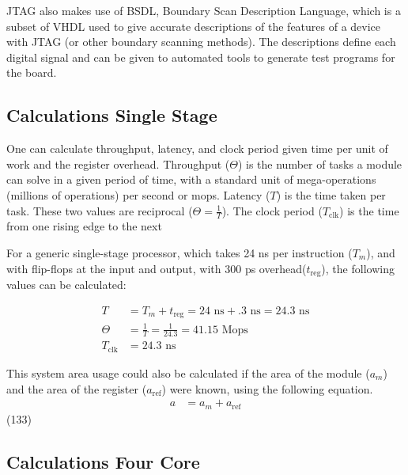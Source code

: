 \documentclass[11pt]{article}
\begin{document}
JTAG also makes use of BSDL, Boundary Scan Description Language,
which is a subset of VHDL used to give accurate descriptions of the features of a device with JTAG (or other boundary scanning methods).
The descriptions define each digital signal and can be given to automated tools to generate test programs for the board\cite{Corelis}.


\subsection{Calculations Single Stage} \label{sec:single}

One can calculate throughput, latency, and clock period given time per unit of work and the register overhead.
Throughput ($\Theta$) is the number of tasks a module can solve in a given period of time, with a standard unit of mega-operations (millions of operations) per second or mops\cite{dally}.
Latency ($T$) is the time taken per task\cite{dally}. 
These two values are reciprocal ($\Theta = \frac{1}{T}$).
The clock period ($T_{\text{clk}}$) is the time from one rising edge to the next

For a generic single-stage processor, which takes 24 ns per instruction ($T_m$), and with flip-flops at the input and output, with 300 ps overhead($t_{\text{reg}}$), the following values can be calculated:

\begin{align}
    T &= T_m + t_{\text{reg}} = 24\text{ ns} + .3\text{ ns} = 24.3\text{ ns}\\
    \Theta &= \frac{1}{T} = \frac{1}{24.3} = 41.15\text{ Mops}\\
    T_{\text{clk}} &= 24.3\text{ ns}
\end{align}

This system area usage could also be calculated if the area of the module ($a_m$) and the area of the register ($a_{\text{ref}}$) were known, using the following equation.
\begin{align}
    a &= a_m + a_{\text{ref}}
\end{align}
(133)

\subsection{Calculations Four Core}
\end{document}
